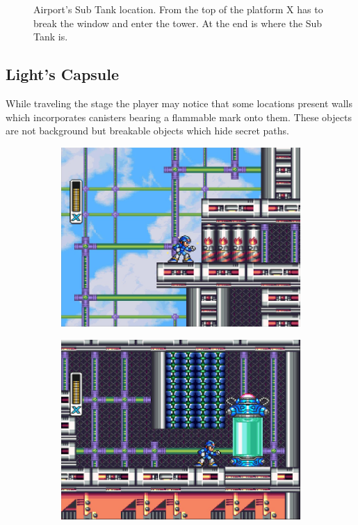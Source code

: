 \begin{figure}[htp]
\begin{subfigure}{0.4\linewidth}
 		\caption{}
 	\end{subfigure}
 	\caption{Airport's Sub Tank location. From the top of the platform X has to break the window and enter the tower. At the end is where the Sub Tank is.}
 \end{figure}
 
\subsection{Light's Capsule} 

 While traveling the stage the player may notice that some locations present walls which incorporates canisters bearing a flammable mark onto them. These objects are not background but breakable objects which hide secret paths. 
  \begin{figure}[htp]
 	\centering
 	\begin{subfigure}{0.4\linewidth}
 		\centering
 		\includegraphics[width=\linewidth]{figures/X1/Storm_eagle/Storm_armor_1.jpg}
 		\caption{}
 	\end{subfigure}
 	\begin{subfigure}{0.4\linewidth}
 		\centering
 		\includegraphics[width=\linewidth]{figures/X1/Storm_eagle/Storm_armor_2.jpg}

\end{subfigure}
\end{figure}
